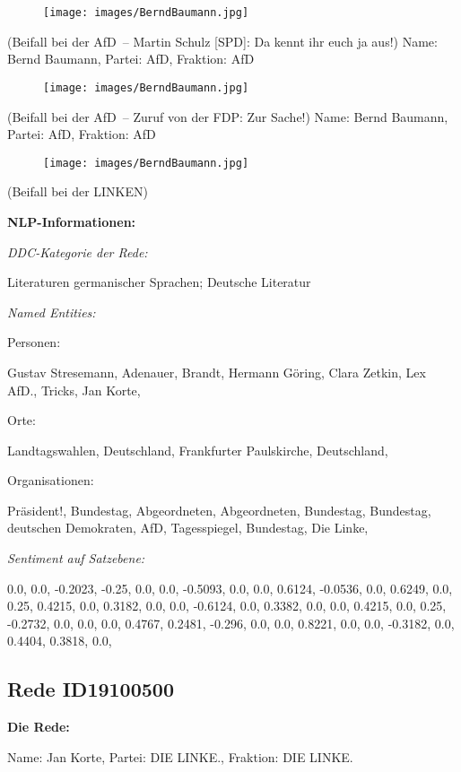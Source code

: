 \documentclass[10pt, a4paper]{report}
\begin{document}
\begin{figure}[!ht]
\texttt{[image: images/BerndBaumann.jpg]}
\end{figure}


(Beifall bei der AfD – Martin Schulz [SPD]: Da kennt ihr euch ja aus!)
Name: Bernd Baumann, Partei: AfD, Fraktion: AfD

\begin{figure}[!ht]
\texttt{[image: images/BerndBaumann.jpg]}
\end{figure}


(Beifall bei der AfD – Zuruf von der FDP: Zur Sache!)
Name: Bernd Baumann, Partei: AfD, Fraktion: AfD

\begin{figure}[!ht]
\texttt{[image: images/BerndBaumann.jpg]}
\end{figure}


(Beifall bei der LINKEN)


\textbf{NLP-Informationen:}

\textit{DDC-Kategorie der Rede:}

Literaturen germanischer Sprachen; Deutsche Literatur

\textit{Named Entities:}

Personen:

Gustav Stresemann, Adenauer, Brandt, Hermann Göring, Clara Zetkin, Lex AfD., Tricks, Jan Korte, 

Orte:

Landtagswahlen, Deutschland, Frankfurter Paulskirche, Deutschland, 

Organisationen:

Präsident!, Bundestag, Abgeordneten, Abgeordneten, Bundestag, Bundestag, deutschen Demokraten, AfD, Tagesspiegel, Bundestag, Die Linke, 

\textit{Sentiment auf Satzebene:}

0.0, 0.0, -0.2023, -0.25, 0.0, 0.0, -0.5093, 0.0, 0.0, 0.6124, -0.0536, 0.0, 0.6249, 0.0, 0.25, 0.4215, 0.0, 0.3182, 0.0, 0.0, -0.6124, 0.0, 0.3382, 0.0, 0.0, 0.4215, 0.0, 0.25, -0.2732, 0.0, 0.0, 0.0, 0.4767, 0.2481, -0.296, 0.0, 0.0, 0.8221, 0.0, 0.0, -0.3182, 0.0, 0.4404, 0.3818, 0.0, 
\subsection{Rede ID19100500}

\textbf{Die Rede:}

Name: Jan Korte, Partei: DIE LINKE., Fraktion: DIE LINKE.
\end{document}
